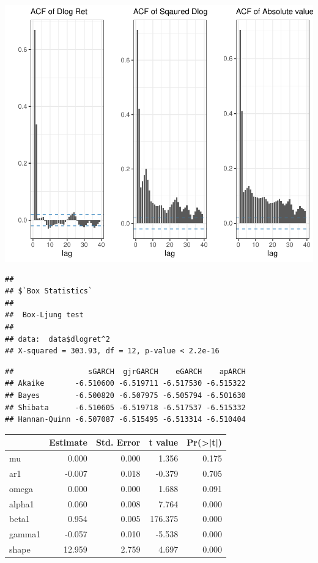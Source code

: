 \documentclass[11pt,preprint, authoryear]{elsarticle}
\let\origtable\table
\let\endorigtable\endtable
\renewenvironment{table}[1][2] {
    \expandafter\origtable\expandafter[H]
} {
    \endorigtable
}
\numberwithin{equation}{section}
\numberwithin{figure}{section}
\numberwithin{table}{section}
\begin{document}
\includegraphics{Question4_files/figure-latex/q4_2-2.pdf}

\begin{verbatim}
## 
## $`Box Statistics`
## 
##  Box-Ljung test
## 
## data:  data$dlogret^2
## X-squared = 303.93, df = 12, p-value < 2.2e-16
\end{verbatim}

\begin{verbatim}
##                 sGARCH  gjrGARCH    eGARCH    apARCH
## Akaike       -6.510600 -6.519711 -6.517530 -6.515322
## Bayes        -6.500820 -6.507975 -6.505794 -6.501630
## Shibata      -6.510605 -6.519718 -6.517537 -6.515332
## Hannan-Quinn -6.507087 -6.515495 -6.513314 -6.510404
\end{verbatim}

\begin{table}

\caption{\label{tab:coef}GARCH Coefficients}
\centering
\begin{tabular}[t]{l|r|r|r|r}
\hline
  &  Estimate &  Std. Error &  t value & Pr(>|t|)\\
\hline
mu & 0.000 & 0.000 & 1.356 & 0.175\\
\hline
ar1 & -0.007 & 0.018 & -0.379 & 0.705\\
\hline
omega & 0.000 & 0.000 & 1.688 & 0.091\\
\hline
alpha1 & 0.060 & 0.008 & 7.764 & 0.000\\
\hline
beta1 & 0.954 & 0.005 & 176.375 & 0.000\\
\hline
gamma1 & -0.057 & 0.010 & -5.538 & 0.000\\
\hline
shape & 12.959 & 2.759 & 4.697 & 0.000\\
\hline
\end{tabular}
\end{table}
\end{document}
